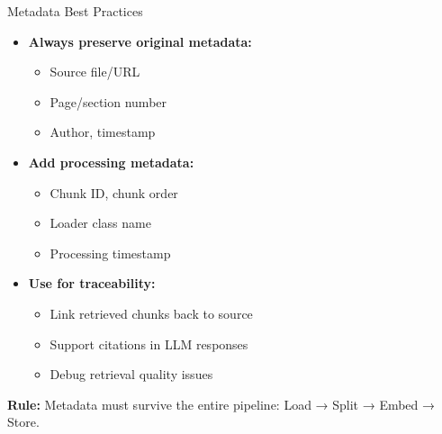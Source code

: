 \documentclass[aspectratio=169,11pt]{beamer}
\begin{document}
\begin{frame}{Metadata Best Practices}
  \begin{itemize}
    \setlength{\itemsep}{1pt}
    \item \textbf{Always preserve original metadata:}
    \begin{itemize}
    \setlength{\itemsep}{1pt}
      \item Source file/URL
      \item Page/section number
      \item Author, timestamp
    \end{itemize}

    \item \textbf{Add processing metadata:}
    \begin{itemize}
    \setlength{\itemsep}{1pt}
      \item Chunk ID, chunk order
      \item Loader class name
      \item Processing timestamp
    \end{itemize}

    \item \textbf{Use for traceability:}
    \begin{itemize}
    \setlength{\itemsep}{1pt}
      \item Link retrieved chunks back to source
      \item Support citations in LLM responses
      \item Debug retrieval quality issues
    \end{itemize}
  \end{itemize}

  \vspace{0.5cm}
  \textbf{Rule:} Metadata must survive the entire pipeline: Load → Split → Embed → Store.
\end{frame}
\end{document}
